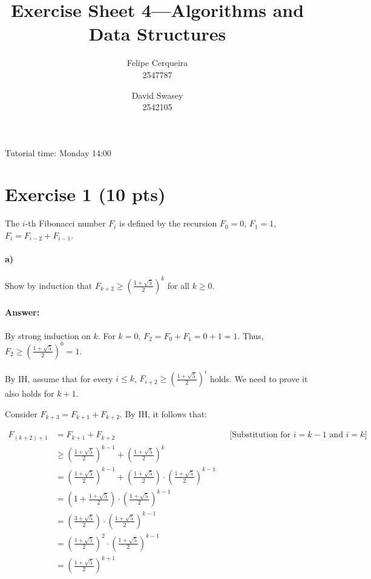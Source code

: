 \documentclass[a4paper]{article}
\title{Exercise Sheet 4---Algorithms and Data Structures}
\author{Felipe Cerqueira \\ 2547787 \and David Swasey \\ 2542105}
\begin{document}
\maketitle

Tutorial time: Monday 14:00

\section{Exercise 1 (10 pts)}

The $i$-th Fibonacci number $F_i$ is defined by the recursion $F_0 = 0$, $F_1 = 1$, $F_i = F_{i-2} + F_{i-1}$.

\paragraph{a)} Show by induction that $F_{k+2} \ge \left ( \frac{1 + \sqrt{5}}{2} \right )^k$ for all $k \ge 0$.

\paragraph{Answer:}

By strong induction on $k$. For $k=0$, $F_{2} = F_0 + F_1 = 0 + 1 = 1$. Thus, $F_2 \ge \left ( \frac{1 + \sqrt{5}}{2} \right )^0 = 1$.

By IH, assume that for every $i \le k$, $F_{i+2} \ge \left ( \frac{1 + \sqrt{5}}{2} \right )^i$ holds. We need to prove it also holds for $k+1$.

Consider $F_{k+3} = F_{k+1} + F_{k+2}$. By IH, it follows that:

\begin{align*}
F_{(k+2) + 1} & = F_{k+1} + F_{k+2} && \text{[Substitution for $i=k-1$ and $i=k$]} \\
& \ge \left ( \frac{1 + \sqrt{5}}{2} \right )^{k-1} + \left ( \frac{1 + \sqrt{5}}{2} \right )^{k} \\
& = \left ( \frac{1 + \sqrt{5}}{2} \right )^{k-1} + \left ( \frac{1 + \sqrt{5}}{2} \right ) \cdot \left ( \frac{1 + \sqrt{5}}{2} \right )^{k-1} \\
& = \left (1 + \frac{1 + \sqrt{5}}{2} \right ) \cdot \left ( \frac{1 + \sqrt{5}}{2} \right )^{k-1} \\
& = \left ( \frac{3 + \sqrt{5}}{2} \right ) \cdot \left ( \frac{1 + \sqrt{5}}{2} \right )^{k-1} \\
& = \left ( \frac{1 + \sqrt{5}}{2} \right )^{2} \cdot \left ( \frac{1 + \sqrt{5}}{2} \right )^{k-1} \\
& = \left ( \frac{1 + \sqrt{5}}{2} \right )^{k+1}
\end{align*}
\end{document}
